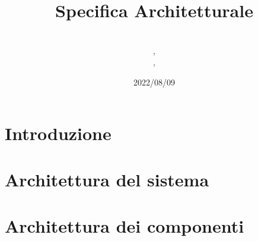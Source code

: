\documentclass{classes/base}
\title{Specifica Architetturale}
\date{2022/08/09}
\author{\\ \marcov, \\ \marcob, \\ \matteo}
\begin{document}
	\maketitle
	\newpage
	
	\newpage
	\tableofcontents
	\newpage
	\listoffigures
  
	\newpage
	\section{Introduzione}
	

	\newpage
	\section{Architettura del sistema}
	

	\newpage
	\section{Architettura dei componenti}
	
\end{document}
